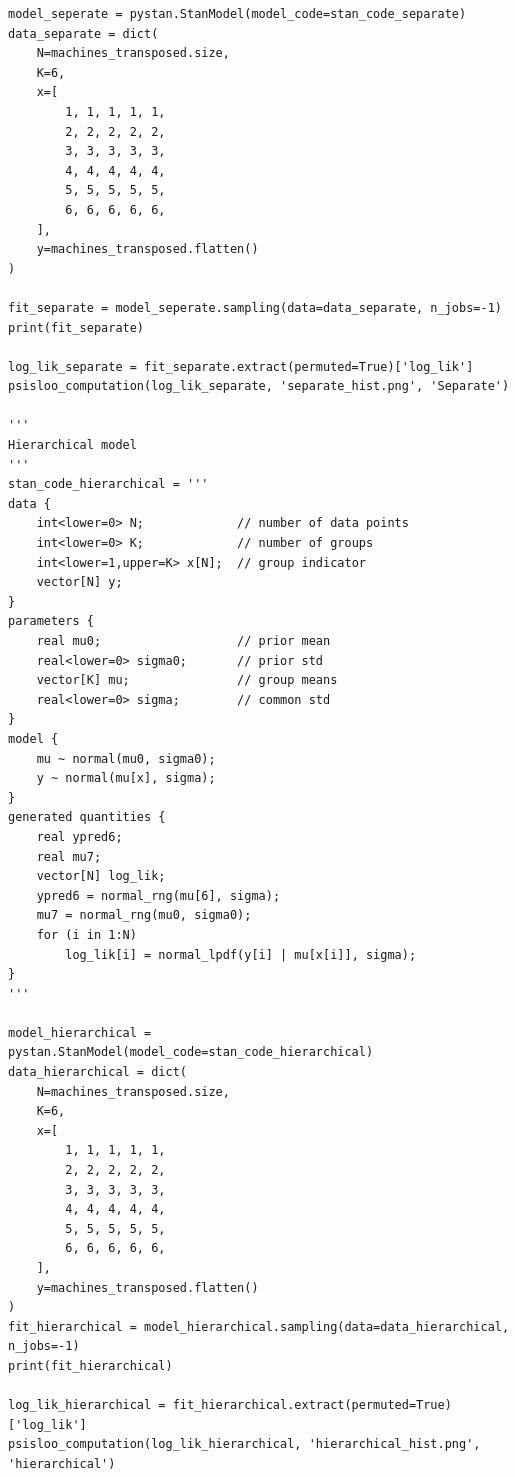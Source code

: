 \documentclass{article}
\begin{document}
\begin{verbatim}
model_seperate = pystan.StanModel(model_code=stan_code_separate)
data_separate = dict(
    N=machines_transposed.size,
    K=6,
    x=[
        1, 1, 1, 1, 1,
        2, 2, 2, 2, 2,
        3, 3, 3, 3, 3,
        4, 4, 4, 4, 4,
        5, 5, 5, 5, 5,
        6, 6, 6, 6, 6,
    ],
    y=machines_transposed.flatten()
)

fit_separate = model_seperate.sampling(data=data_separate, n_jobs=-1)
print(fit_separate)

log_lik_separate = fit_separate.extract(permuted=True)['log_lik']
psisloo_computation(log_lik_separate, 'separate_hist.png', 'Separate')

'''
Hierarchical model
'''
stan_code_hierarchical = '''
data {
    int<lower=0> N;             // number of data points
    int<lower=0> K;             // number of groups
    int<lower=1,upper=K> x[N];  // group indicator
    vector[N] y;
}
parameters {
    real mu0;                   // prior mean
    real<lower=0> sigma0;       // prior std
    vector[K] mu;               // group means
    real<lower=0> sigma;        // common std
}
model {
    mu ~ normal(mu0, sigma0);
    y ~ normal(mu[x], sigma);
}
generated quantities {
    real ypred6;
    real mu7;
    vector[N] log_lik;
    ypred6 = normal_rng(mu[6], sigma);
    mu7 = normal_rng(mu0, sigma0);
    for (i in 1:N)
        log_lik[i] = normal_lpdf(y[i] | mu[x[i]], sigma);
}
'''

model_hierarchical = pystan.StanModel(model_code=stan_code_hierarchical)
data_hierarchical = dict(
    N=machines_transposed.size,
    K=6,
    x=[
        1, 1, 1, 1, 1,
        2, 2, 2, 2, 2,
        3, 3, 3, 3, 3,
        4, 4, 4, 4, 4,
        5, 5, 5, 5, 5,
        6, 6, 6, 6, 6,
    ],
    y=machines_transposed.flatten()
)
fit_hierarchical = model_hierarchical.sampling(data=data_hierarchical, n_jobs=-1)
print(fit_hierarchical)

log_lik_hierarchical = fit_hierarchical.extract(permuted=True)['log_lik']
psisloo_computation(log_lik_hierarchical, 'hierarchical_hist.png', 'hierarchical')
\end{verbatim}
\end{document}
